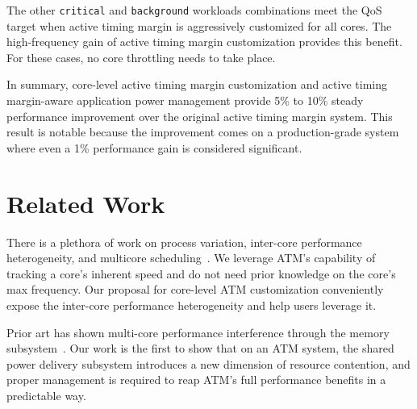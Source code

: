 The other \texttt{critical} and \texttt{background} workloads combinations meet the QoS target when active timing margin is aggressively customized for all cores. The high-frequency gain of active timing margin customization provides this benefit. For these cases, no core throttling needs to take place.

In summary, core-level active timing margin customization and active timing margin-aware application power management provide 5\% to 10\% steady performance improvement over the original active timing margin system. This result is notable because the improvement comes on a production-grade system where even a 1\% performance gain is considered significant.

\section{Related Work}
\label{sec:process:related}

There is a plethora of work on process variation, inter-core performance heterogeneity, and multicore scheduling~\cite{liang2007process,sarangi2008varius,teodorescu2008variation,rangan2009thread,dighe2010within,rangan2011achieving}. We leverage ATM's capability of tracking a core's inherent speed and do not need prior knowledge on the core's max frequency. Our proposal for core-level ATM customization conveniently expose the inter-core performance heterogeneity and help users leverage it.

Prior art has shown multi-core performance interference through the memory subsystem~\cite{mars11micro,tang11isca,delimitrou2014quasar,lo2015heracles,verma2015large,llull2017cooper}. Our work is the first to show that on an ATM system, the shared power delivery subsystem introduces a new dimension of resource contention, and proper management is required to reap ATM's full performance benefits in a predictable way.

